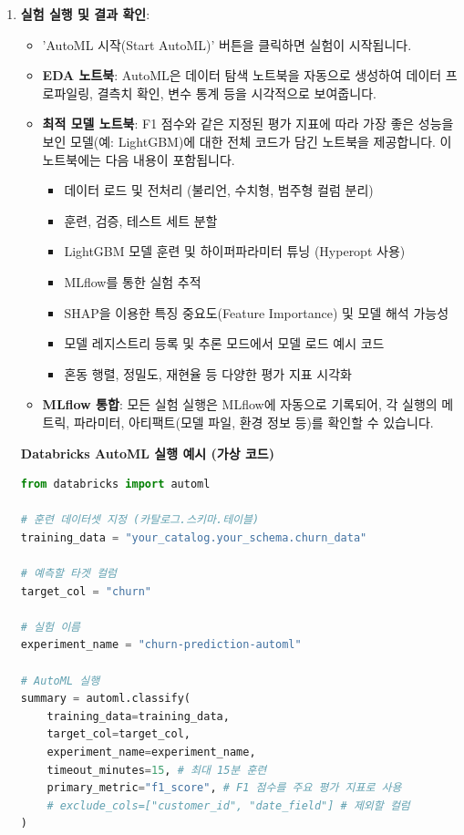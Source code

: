 \documentclass[11pt,a4paper]{article}
\begin{document}
\begin{itemize}
\begin{itemize}
\begin{itemize}
\begin{itemize}
\begin{itemize}
\begin{enumerate}
    \item \textbf{실험 실행 및 결과 확인}:
    \begin{itemize}
        \item 'AutoML 시작(Start AutoML)' 버튼을 클릭하면 실험이 시작됩니다.
        \item \textbf{EDA 노트북}: AutoML은 데이터 탐색 노트북을 자동으로 생성하여 데이터 프로파일링, 결측치 확인, 변수 통계 등을 시각적으로 보여줍니다.
        \item \textbf{최적 모델 노트북}: F1 점수와 같은 지정된 평가 지표에 따라 가장 좋은 성능을 보인 모델(예: LightGBM)에 대한 전체 코드가 담긴 노트북을 제공합니다. 이 노트북에는 다음 내용이 포함됩니다.
        \begin{itemize}
            \item 데이터 로드 및 전처리 (불리언, 수치형, 범주형 컬럼 분리)
            \item 훈련, 검증, 테스트 세트 분할
            \item LightGBM 모델 훈련 및 하이퍼파라미터 튜닝 (Hyperopt 사용)
            \item MLflow를 통한 실험 추적
            \item SHAP을 이용한 특징 중요도(Feature Importance) 및 모델 해석 가능성
            \item 모델 레지스트리 등록 및 추론 모드에서 모델 로드 예시 코드
            \item 혼동 행렬, 정밀도, 재현율 등 다양한 평가 지표 시각화
        \end{itemize}
        \item \textbf{MLflow 통합}: 모든 실험 실행은 MLflow에 자동으로 기록되어, 각 실행의 메트릭, 파라미터, 아티팩트(모델 파일, 환경 정보 등)를 확인할 수 있습니다.
    \end{itemize}

\begin{examplebox}
\textbf{Databricks AutoML 실행 예시 (가상 코드)}
\begin{lstlisting}[language=Python, caption=Databricks AutoML 실행 코드 스니펫, label=lst:automl_run]
from databricks import automl

# 훈련 데이터셋 지정 (카탈로그.스키마.테이블)
training_data = "your_catalog.your_schema.churn_data"

# 예측할 타겟 컬럼
target_col = "churn"

# 실험 이름
experiment_name = "churn-prediction-automl"

# AutoML 실행
summary = automl.classify(
    training_data=training_data,
    target_col=target_col,
    experiment_name=experiment_name,
    timeout_minutes=15, # 최대 15분 훈련
    primary_metric="f1_score", # F1 점수를 주요 평가 지표로 사용
    # exclude_cols=["customer_id", "date_field"] # 제외할 컬럼
)


\end{lstlisting}
\end{examplebox}
\end{enumerate}
\end{itemize}
\end{itemize}
\end{itemize}
\end{itemize}
\end{itemize}
\end{document}
